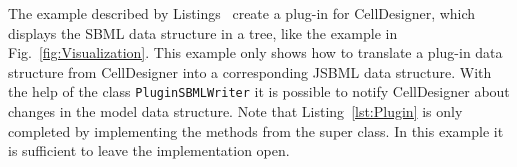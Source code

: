 \documentclass[
  BCOR12mm,
  letterpaper,
  11pt,
  headsepline,
  pointlessnumbers,
  tablecaptionabove,
  headinclude,
  appendixprefix,
  idxtotoc,
  bibtotoc,
  twoside,
  titlepage
]{scrartcl}
\begin{document}
The example described by Listings~
create a plug-in for CellDesigner, which displays the SBML data structure
in a tree, like the example in Fig.~\vref{fig:Visualization}. This example only
shows how to translate a plug-in data structure
from CellDesigner into a corresponding JSBML data structure. With the help of
the class \verb!PluginSBMLWriter! it is possible to notify CellDesigner about
changes in the model data structure. Note that Listing~\vref{lst:Plugin} is only
completed by implementing the methods from the super class. In this example it
is sufficient to leave the implementation open.



\end{document}
